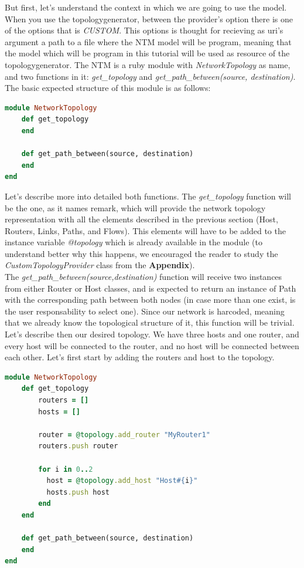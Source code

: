 But first, let's understand the context in which we are going to use the model. \\

When you use the topologygenerator, between the provider's option there is one of the options that is \textit{CUSTOM}. This options is thought for recieving as uri's argument a path to a file where the NTM model will be program, meaning that the model which will be program in this tutorial will be used as resource of the topologygenerator. The NTM is a ruby module with \textit{NetworkTopology} as name, and two functions in it: \textit{get\_topology} and \textit{get\_path\_between(source, destination)}. The basic expected structure of this module is as follows:

\begin{lstlisting}[language=Ruby,breaklines=true]
module NetworkTopology
	def get_topology
	end
    
    def get_path_between(source, destination)
    end
end
\end{lstlisting}

Let's describe more into detailed both functions. The \textit{get\_topology} function will be the one, as it names remark, which will provide the network topology representation with all the elements described in the previous section (Host, Routers, Links, Paths, and Flows). This elements will have to be added to the instance variable \textit{@topology} which is already available in the module (to understand better why this happens, we encouraged the reader to study the \textit{CustomTopologyProvider} class from the \textbf{Appendix}).\\
The \textit{get\_path\_between(source,destination)} function will receive two instances from either Router or Host classes, and is expected to return an instance of Path with the corresponding path between both nodes (in case more than one exist, is the user responsability to select one). Since our network is harcoded, meaning that we already know the topological structure of it, this function will be trivial. \\

Let's describe then our desired topology. We have three hosts and one router, and every host will be connected to the router, and no host will be connected between each other. Let's first start by adding the routers and host to the topology.

\begin{lstlisting}[language=Ruby,breaklines=true]
module NetworkTopology
	def get_topology
		routers = []
        hosts = []

        router = @topology.add_router "MyRouter1"
        routers.push router

        for i in 0..2  
          host = @topology.add_host "Host#{i}"
          hosts.push host     
        end
	end
    
    def get_path_between(source, destination)
    end
end
\end{lstlisting}

